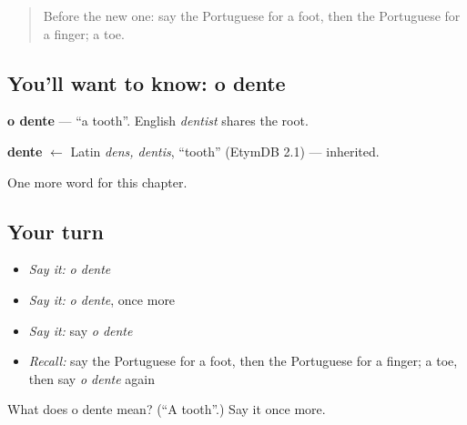 \label{lesson:PT-C30-dente}



\begin{quote}
Before the new one: say the Portuguese for a foot, then the Portuguese for a finger; a toe.
\end{quote}

\subsection*{You'll want to know: o dente}
\textbf{o dente} — \textquotedblleft{}a tooth\textquotedblright{}. English \emph{dentist} shares the root.

\begin{cousinweb}
\textbf{dente} $\leftarrow$ Latin \emph{dens, dentis}, \textquotedblleft{}tooth\textquotedblright{} (EtymDB 2.1) — inherited.
\end{cousinweb}

\begin{grammarlens}[title={What you've built}]
One more word for this chapter.
\end{grammarlens}

\subsection*{Your turn}
\begin{itemize}
\raggedright
  \item \emph{Say it:} \emph{o dente}
  \item \emph{Say it:} \emph{o dente}, once more
  \item \emph{Say it:} say \emph{o dente}
  \item \emph{Recall:} say the Portuguese for a foot, then the Portuguese for a finger; a toe, then say \emph{o dente} again
\end{itemize}

\begin{tcolorbox}[breakable,colback=teal!4,colframe=teal!35!black,title={Before you move on}]
What does o dente mean? (\textquotedblleft{}A tooth\textquotedblright{}.) Say it once more.
\end{tcolorbox}
